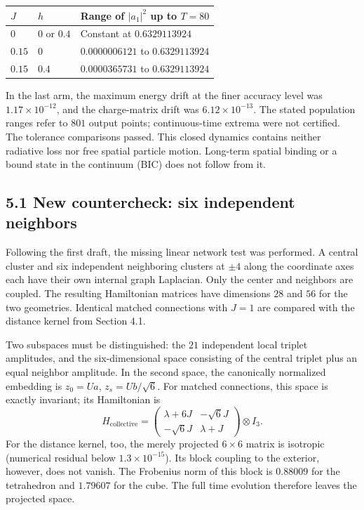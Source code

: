 \documentclass[a4paper,11pt]{article}
\newenvironment{drafttable}{\begin{center}\small\renewcommand{\arraystretch}{1.2}}{\end{center}}
\begin{document}
\begin{drafttable}
\begin{tabular}{@{}lll@{}}\toprule
$J$ & $h$ & Range of $|a_1|^2$ up to $T=80$\\\midrule
$0$ & $0$ or $0.4$ & Constant at $0.6329113924$\\
$0.15$ & $0$ & $0.0000006121$ to $0.6329113924$\\
$0.15$ & $0.4$ & $0.0000365731$ to $0.6329113924$\\\bottomrule
\end{tabular}
\end{drafttable}
In the last arm, the maximum energy drift at the finer accuracy level was $1.17\times10^{-12}$, and the charge-matrix drift was $6.12\times10^{-13}$. The stated population ranges refer to $801$ output points; continuous-time extrema were not certified. The tolerance comparisons passed. This closed dynamics contains neither radiative loss nor free spatial particle motion. Long-term spatial binding or a bound state in the continuum (BIC) does not follow from it.

\subsection*{5.1 New countercheck: six independent neighbors}
Following the first draft, the missing linear network test was performed. A central cluster and six independent neighboring clusters at $\pm4$ along the coordinate axes each have their own internal graph Laplacian. Only the center and neighbors are coupled. The resulting Hamiltonian matrices have dimensions $28$ and $56$ for the two geometries. Identical matched connections with $J=1$ are compared with the distance kernel from Section 4.1.

Two subspaces must be distinguished: the $21$ independent local triplet amplitudes, and the six-dimensional space consisting of the central triplet plus an equal neighbor amplitude. In the second space, the canonically normalized embedding is $z_0=Ua$, $z_s=Ub/\sqrt6$. For matched connections, this space is exactly invariant; its Hamiltonian is
\begin{equation}
H_{\mathrm{collective}}=
\begin{pmatrix}\lambda+6J&-\sqrt6J\\-\sqrt6J&\lambda+J\end{pmatrix}\otimes I_3.\tag{10}
\end{equation}
For the distance kernel, too, the merely projected $6\times6$ matrix is isotropic (numerical residual below $1.3\times10^{-15}$). Its block coupling to the exterior, however, does not vanish. The Frobenius norm of this block is $0.88009$ for the tetrahedron and $1.79607$ for the cube. The full time evolution therefore leaves the projected space.
\end{document}
